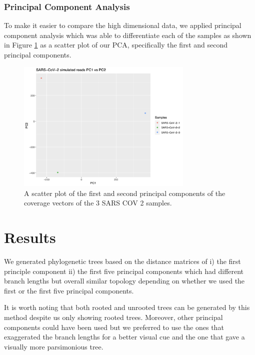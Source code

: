 \documentclass[10pt, a4paper]{article}
\begin{document}
\newpage
\subsubsection{Principal Component Analysis}
\label{sec:org20d12f3}
To make it easier to compare the high dimensional data, we applied principal 
component analysis which was able to differentiate each of the samples as shown
in Figure \ref{fig:orgdd236bf} as a scatter plot of our PCA, specifically the first and 
second principal components.

\begin{figure}[h]
\centering
\includegraphics[width=0.75\textwidth]{../Figures/SARS_CoV_2/PCA.png}
\caption[SARS-CoV-2 PCA]{\label{fig:orgdd236bf}
A scatter plot of the first and second principal components of the coverage vectors of the 3 SARS COV 2 samples.}
\end{figure}

\clearpage
\section{Results}
\label{sec:org8573a4e}
We generated phylogenetic trees based on the distance matrices of i) the first 
principle component ii) the first five principal components which had different 
branch lengths but overall similar topology depending on whether we used the 
first or the first five principal components. 

It is worth noting that both rooted and unrooted trees can be generated by this
method despite us only showing rooted trees. Moreover, other principal
components could have been used but we preferred to use the ones that
exaggerated the branch lengths for a better visual cue and the one that gave a 
visually more parsimonious tree.

\end{document}
